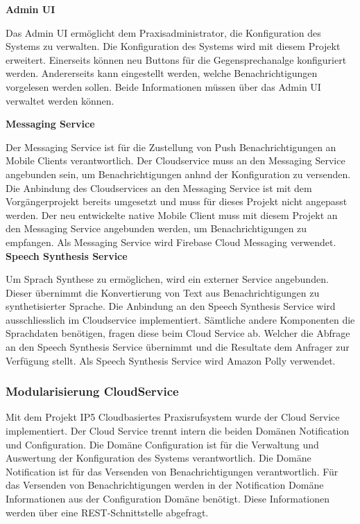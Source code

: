 \textbf{Admin UI}

Das Admin UI ermöglicht dem Praxisadministrator, die Konfiguration des Systems zu verwalten.
Die Konfiguration des Systems wird mit diesem Projekt erweitert.
Einerseits können neu Buttons für die Gegensprechanalge konfiguriert werden.
Andererseits kann eingestellt werden, welche Benachrichtigungen vorgelesen werden sollen.
Beide Informationen müssen über das Admin UI verwaltet werden können.

\textbf{Messaging Service}

Der Messaging Service ist für die Zustellung von Push Benachrichtigungen an Mobile Clients verantwortlich.
Der Cloudservice muss an den Messaging Service angebunden sein, um Benachrichtigungen anhnd der Konfiguration zu versenden.
Die Anbindung des Cloudservices an den Messaging Service ist mit dem Vorgängerprojekt bereits umgesetzt und muss für dieses Projekt nicht angepasst werden.
Der neu entwickelte native Mobile Client muss mit diesem Projekt an den Messaging Service angebunden werden, um Benachrichtigungen zu empfangen.
Als Messaging Service wird Firebase Cloud Messaging verwendet.\\

\textbf{Speech Synthesis Service}

Um Sprach Synthese zu ermöglichen, wird ein externer Service angebunden.
Dieser übernimmt die Konvertierung von Text aus Benachrichtigungen zu synthetisierter Sprache.
Die Anbindung an den Speech Synthesis Service wird ausschliesslich im Cloudservice implementiert.
Sämtliche andere Komponenten die Sprachdaten benötigen, fragen diese beim Cloud Service ab.
Welcher die Abfrage an den Speech Synthesis Service übernimmt und die Resultate dem Anfrager zur Verfügung stellt.
Als Speech Synthesis Service wird Amazon Polly verwendet.

\clearpage

\subsubsection{Modularisierung CloudService}

Mit dem Projekt IP5 Cloudbasiertes Praxisrufsystem wurde der Cloud Service implementiert.
Der Cloud Service trennt intern die beiden Domänen Notification und Configuration.
Die Domäne Configuration ist für die Verwaltung und Auswertung der Konfiguration des Systems verantwortlich.
Die Domäne Notification ist für das Versenden von Benachrichtigungen verantwortlich.
Für das Versenden von Benachrichtigungen werden in der Notification Domäne Informationen aus der Configuration Domäne benötigt.
Diese Informationen werden über eine REST-Schnittstelle abgefragt.

